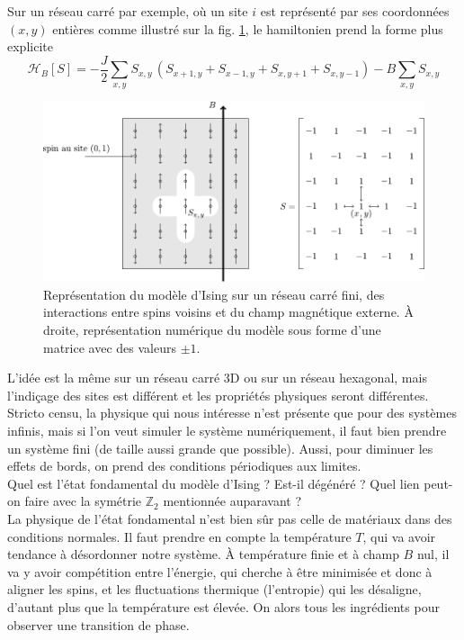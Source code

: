 \documentclass{book}
\begin{document}
Sur un réseau carré par exemple, où un site $i$ est représenté par ses coordonnées $(x,y)$ entières comme illustré sur la fig. \ref{fig:schema_ising}, le hamiltonien prend la forme plus explicite
\begin{equation}
\mathcal{H}_B[S] = -\frac{J}{2}\sum_{x,y}S_{x,y}\,(S_{x+1,y}+S_{x-1,y}+S_{x,y+1}+S_{x,y-1})-B\sum_{x,y}S_{x,y}
\end{equation}

\begin{figure}[H]
\centering
\includegraphics[width=0.85\linewidth]{TD3/schema_ising.pdf}
\caption{Représentation du modèle d'Ising sur un réseau carré fini, des interactions entre spins voisins et du champ magnétique externe. À droite, représentation numérique du modèle sous forme d'une matrice avec des valeurs $\pm 1$.}
\label{fig:schema_ising}
\end{figure}

L'idée est la même sur un réseau carré 3D ou sur un réseau hexagonal, mais l'indiçage des sites est différent et les propriétés physiques seront différentes. Stricto censu, la physique qui nous intéresse n'est présente que pour des systèmes infinis, mais si l'on veut simuler le système numériquement, il faut bien prendre un système fini (de taille aussi grande que possible). Aussi, pour diminuer les effets de bords, on prend des conditions périodiques aux limites.\\

Quel est l'état fondamental du modèle d'Ising ? Est-il dégénéré ? Quel lien peut-on faire avec la symétrie $\mathbb{Z}_2$ mentionnée auparavant ?\\

La physique de l'état fondamental n'est bien sûr pas celle de matériaux dans des conditions normales. Il faut prendre en compte la température $T$, qui va avoir tendance à désordonner notre système. À température finie et à champ $B$ nul, il va y avoir compétition entre l'énergie, qui cherche à être minimisée et donc à aligner les spins, et les fluctuations thermique (l'entropie) qui les désaligne, d'autant plus que la température est élevée. On alors tous les ingrédients pour observer une transition de phase.\\
\end{document}
